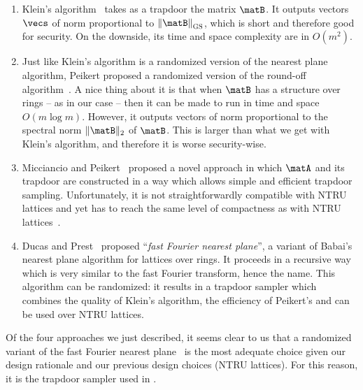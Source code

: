 \begin{enumerate}
 \item Klein's algorithm~\cite{SODA:Klein00} takes as a trapdoor the matrix $\matB$. It outputs vectors $\vecs$ of norm proportional to $\gsnorm{\matB}$, which is short and therefore good for security. On the downside, its time and space complexity are in $O(m^2)$.
 
 \item Just like Klein's algorithm is a randomized version of the nearest plane algorithm, Peikert proposed a randomized version of the round-off algorithm~\cite{C:Peikert10}. A nice thing about it is that when $\matB$ has a structure over rings -- as in our case -- then it can be made to run in time and space $O(m \log m)$. However, it outputs vectors of norm proportional to the spectral norm $\|\matB\|_2$ of $\matB$. This is larger than what we get with Klein's algorithm, and therefore it is worse security-wise.
 
 \item Micciancio and Peikert~\cite{EC:MicPei12} proposed a novel approach in which $\matA$ and its trapdoor are constructed in a way which allows simple and efficient trapdoor sampling. Unfortunately, it is not straightforwardly compatible with NTRU lattices and yet has to reach the same level of compactness as with NTRU lattices~\cite{AC:CheGenMuk19}.
 
 \item Ducas and Prest~\cite{ISSAC:DucPre16} proposed ``\textit{fast Fourier nearest plane}'', a variant of Babai's nearest plane algorithm for lattices over rings. It proceeds in a recursive way which is very similar to the fast Fourier transform, hence the name. This algorithm can be randomized: it results in a trapdoor sampler which combines the quality of Klein's algorithm, the efficiency of Peikert's and can be used over NTRU lattices.
\end{enumerate}

Of the four approaches we just described, it seems clear to us that a randomized variant of the fast Fourier nearest plane~\cite{ISSAC:DucPre16} is the most adequate choice given our design rationale and our previous design choices (NTRU lattices). For this reason, it is the trapdoor sampler used in \falcon.

